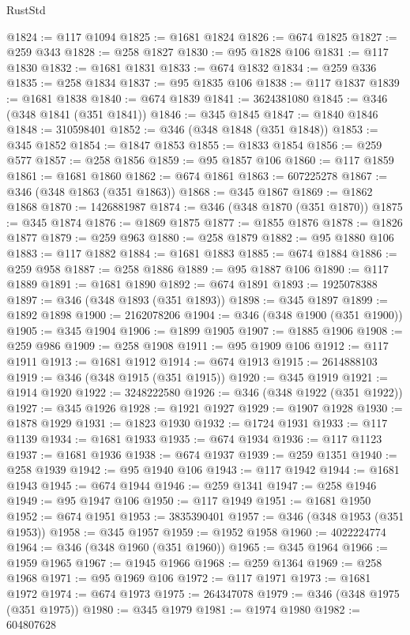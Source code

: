 \begin{lexlean}{RustStd}
\begin{coremodule}
@1824 := @117 @1094
@1825 := @1681 @1824
@1826 := @674 @1825
@1827 := @259 @343
@1828 := @258 @1827
@1830 := @95 @1828 @106
@1831 := @117 @1830
@1832 := @1681 @1831
@1833 := @674 @1832
@1834 := @259 @336
@1835 := @258 @1834
@1837 := @95 @1835 @106
@1838 := @117 @1837
@1839 := @1681 @1838
@1840 := @674 @1839
@1841 := 3624381080
@1845 := @346 (@348 @1841 (@351 @1841))
@1846 := @345 @1845
@1847 := @1840 @1846
@1848 := 310598401
@1852 := @346 (@348 @1848 (@351 @1848))
@1853 := @345 @1852
@1854 := @1847 @1853
@1855 := @1833 @1854
@1856 := @259 @577
@1857 := @258 @1856
@1859 := @95 @1857 @106
@1860 := @117 @1859
@1861 := @1681 @1860
@1862 := @674 @1861
@1863 := 607225278
@1867 := @346 (@348 @1863 (@351 @1863))
@1868 := @345 @1867
@1869 := @1862 @1868
@1870 := 1426881987
@1874 := @346 (@348 @1870 (@351 @1870))
@1875 := @345 @1874
@1876 := @1869 @1875
@1877 := @1855 @1876
@1878 := @1826 @1877
@1879 := @259 @963
@1880 := @258 @1879
@1882 := @95 @1880 @106
@1883 := @117 @1882
@1884 := @1681 @1883
@1885 := @674 @1884
@1886 := @259 @958
@1887 := @258 @1886
@1889 := @95 @1887 @106
@1890 := @117 @1889
@1891 := @1681 @1890
@1892 := @674 @1891
@1893 := 1925078388
@1897 := @346 (@348 @1893 (@351 @1893))
@1898 := @345 @1897
@1899 := @1892 @1898
@1900 := 2162078206
@1904 := @346 (@348 @1900 (@351 @1900))
@1905 := @345 @1904
@1906 := @1899 @1905
@1907 := @1885 @1906
@1908 := @259 @986
@1909 := @258 @1908
@1911 := @95 @1909 @106
@1912 := @117 @1911
@1913 := @1681 @1912
@1914 := @674 @1913
@1915 := 2614888103
@1919 := @346 (@348 @1915 (@351 @1915))
@1920 := @345 @1919
@1921 := @1914 @1920
@1922 := 3248222580
@1926 := @346 (@348 @1922 (@351 @1922))
@1927 := @345 @1926
@1928 := @1921 @1927
@1929 := @1907 @1928
@1930 := @1878 @1929
@1931 := @1823 @1930
@1932 := @1724 @1931
@1933 := @117 @1139
@1934 := @1681 @1933
@1935 := @674 @1934
@1936 := @117 @1123
@1937 := @1681 @1936
@1938 := @674 @1937
@1939 := @259 @1351
@1940 := @258 @1939
@1942 := @95 @1940 @106
@1943 := @117 @1942
@1944 := @1681 @1943
@1945 := @674 @1944
@1946 := @259 @1341
@1947 := @258 @1946
@1949 := @95 @1947 @106
@1950 := @117 @1949
@1951 := @1681 @1950
@1952 := @674 @1951
@1953 := 3835390401
@1957 := @346 (@348 @1953 (@351 @1953))
@1958 := @345 @1957
@1959 := @1952 @1958
@1960 := 4022224774
@1964 := @346 (@348 @1960 (@351 @1960))
@1965 := @345 @1964
@1966 := @1959 @1965
@1967 := @1945 @1966
@1968 := @259 @1364
@1969 := @258 @1968
@1971 := @95 @1969 @106
@1972 := @117 @1971
@1973 := @1681 @1972
@1974 := @674 @1973
@1975 := 264347078
@1979 := @346 (@348 @1975 (@351 @1975))
@1980 := @345 @1979
@1981 := @1974 @1980
@1982 := 604807628

\end{coremodule}
\end{lexlean}
